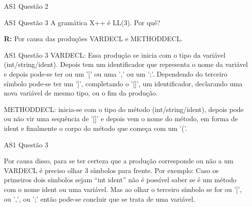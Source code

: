 \documentclass[10pt]{beamer}
\begin{document}
\begin{frame}{AS1 Questão 2}

\end{frame}

\begin{frame}{AS1 Questão 3}
    A gramática X++ é LL(3). Por quê?

    \textbf{R:} Por causa das produções VARDECL e METHODDECL.

\end{frame}

\begin{frame}{AS1 Questão 3}
    VARDECL: Essa produção se inicia com o tipo da variável (int/string/ident).
    Depois tem um identificador que representa o nome da variável e depois
    pode-se ter ou um '[' ou uma ',' ou um ';'. Dependendo do terceiro símbolo
    pode-se ter um ']', completando o '[]', um identificador, declarando uma
    nova variável de mesmo tipo, ou o fim da produção.

    METHODDECL: inicia-se com o tipo do método (int/string/ident), depois pode
    ou não vir uma sequência de '[]' e depois vem o nome do método, em forma de
    ident e finalmente o corpo do método que começa com um '('.

\end{frame}

\begin{frame}{AS1 Questão 3}

    Por causa disso, para se ter certeza que a produção corresponde ou não a um
    VARDECL é preciso olhar 3 símbolos para frente. Por exemplo: Caso os
    primeiros dois símbolos sejam ``int ident'' não é possível saber se é um
    método com o nome ident ou uma variável. Mas ao olhar o terceiro símbolo se
    for ou '[', ou ',', ou ';' então pode-se concluir que se trata de uma
    variável.

\end{frame}
\end{document}

